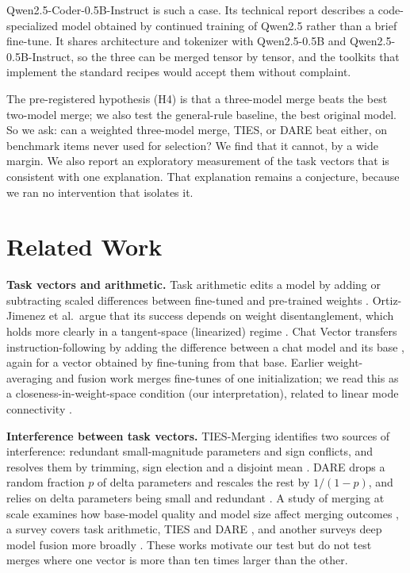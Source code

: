 \documentclass[conference]{IEEEtran}
\begin{document}
Qwen2.5-Coder-0.5B-Instruct \cite{hui2024qwen25coder} is such a case. Its technical report describes a code-specialized model obtained by continued training of Qwen2.5 \cite{yang2024qwen25} rather than a brief fine-tune. It shares architecture and tokenizer with Qwen2.5-0.5B and Qwen2.5-0.5B-Instruct, so the three can be merged tensor by tensor, and the toolkits that implement the standard recipes \cite{goddard2024mergekit} would accept them without complaint.

The pre-registered hypothesis (H4) is that a three-model merge beats the best two-model merge; we also test the general-rule baseline, the best original model. So we ask: can a weighted three-model merge, TIES, or DARE beat either, on benchmark items never used for selection? We find that it cannot, by a wide margin. We also report an exploratory measurement of the task vectors that is consistent with one explanation. That explanation remains a conjecture, because we ran no intervention that isolates it.

\section{Related Work}
\textbf{Task vectors and arithmetic.} Task arithmetic edits a model by adding or subtracting scaled differences between fine-tuned and pre-trained weights \cite{ilharco2022editing}. Ortiz-Jimenez et al.\ argue that its success depends on weight disentanglement, which holds more clearly in a tangent-space (linearized) regime \cite{ortizjimenez2023tangent}. Chat Vector transfers instruction-following by adding the difference between a chat model and its base \cite{huang2023chatvector}, again for a vector obtained by fine-tuning from that base. Earlier weight-averaging and fusion work \cite{wortsman2022soups,jin2022dataless,matena2021fisher} merges fine-tunes of one initialization; we read this as a closeness-in-weight-space condition (our interpretation), related to linear mode connectivity \cite{frankle2019lmc}.

\textbf{Interference between task vectors.} TIES-Merging identifies two sources of interference: redundant small-magnitude parameters and sign conflicts, and resolves them by trimming, sign election and a disjoint mean \cite{yadav2023ties}. DARE drops a random fraction $p$ of delta parameters and rescales the rest by $1/(1-p)$, and relies on delta parameters being small and redundant \cite{yu2023dare}. A study of merging at scale examines how base-model quality and model size affect merging outcomes \cite{yadav2024matters}, a survey covers task arithmetic, TIES and DARE \cite{yang2024survey}, and another surveys deep model fusion more broadly \cite{li2023fusion}. These works motivate our test but do not test merges where one vector is more than ten times larger than the other.
\end{document}
